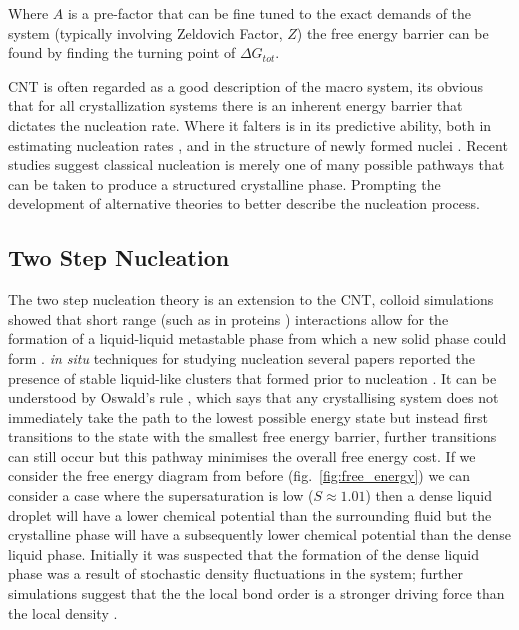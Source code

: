 Where $A$ is a pre-factor that can be fine tuned to the exact demands
of the system (typically involving Zeldovich Factor, $Z$) the free 
energy barrier can be found by finding the turning point of $\Delta G_{tot}$. 

CNT is often regarded as a good description of the macro system, its obvious
that for all crystallization systems there is an inherent energy barrier that 
dictates the nucleation rate. Where it falters is in its predictive ability, 
both in estimating nucleation rates \cite{Gharibeh2005, Vekilov2010}, and in 
the structure of newly formed nuclei \cite{Lee1999, Yau2001}. Recent studies 
suggest classical nucleation is merely one of many possible pathways that can 
be taken to produce a structured crystalline phase. Prompting the development of alternative theories to better describe the nucleation process.

\subsection{Two Step Nucleation}
The two step nucleation theory is an extension to the CNT, colloid simulations 
showed that short range (such as in proteins \cite{Wolde1997, Gliko2005}) 
interactions allow for the formation of a liquid-liquid metastable phase from 
which a new solid phase could form \cite{Anderson2002, Karthika2016}. 
\textit{in situ} techniques for studying nucleation several papers reported 
the presence of stable liquid-like clusters that formed prior to nucleation
\cite{Savage2009, Wolde1997, Soga1999}. It can be understood by Oswald's rule
\cite{Ostwald1897}, which says that any crystallising system does not immediately 
take the path to the lowest possible energy state but instead first transitions 
to the state with the smallest free energy barrier, further transitions can still 
occur but this pathway minimises the overall free energy cost. If we consider 
the free energy diagram from before (fig.~\ref{fig:free_energy}) we can consider 
a case where the supersaturation is low ($S\approx1.01$) then a dense liquid 
droplet will have a lower chemical potential than the surrounding fluid but 
the crystalline phase will have a subsequently lower chemical potential than 
the dense liquid phase. Initially it was suspected that the formation of the 
dense liquid phase was a result of stochastic density fluctuations in the system; 
further simulations suggest that the the local bond order is a stronger driving 
force than the local density \cite{Tan2013}. 

